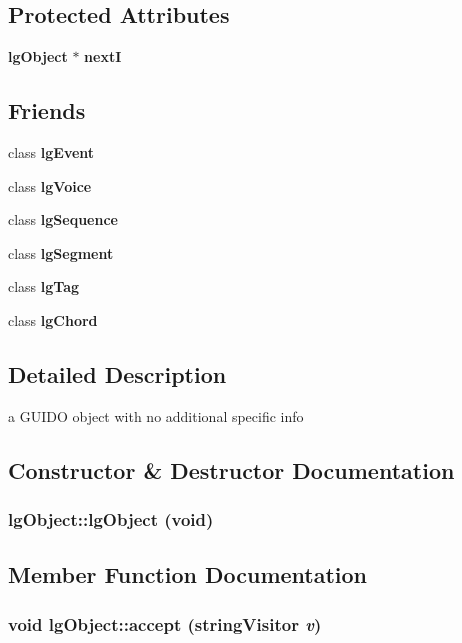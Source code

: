 \subsection*{Protected Attributes}
\begin{CompactItemize}
\item 
{\bf lg\-Object} $\ast$ {\bf next\-I}
\end{CompactItemize}
\subsection*{Friends}
\begin{CompactItemize}
\item 
class {\bf lg\-Event}
\item 
class {\bf lg\-Voice}
\item 
class {\bf lg\-Sequence}
\item 
class {\bf lg\-Segment}
\item 
class {\bf lg\-Tag}
\item 
class {\bf lg\-Chord}
\end{CompactItemize}


\subsection{Detailed Description}
a GUIDO object with no additional specific info 



\subsection{Constructor \& Destructor Documentation}
\subsubsection{\setlength{\rightskip}{0pt plus 5cm}lg\-Object::lg\-Object (void)}\label{classlgObject_a2}




\subsection{Member Function Documentation}
\subsubsection{\setlength{\rightskip}{0pt plus 5cm}void lg\-Object::accept ({\bf string\-Visitor} {\em v})}\label{classlgObject_a0}




